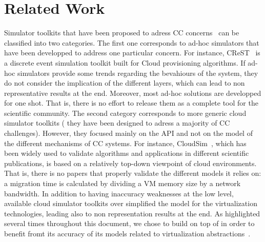 \section{Related Work}
\label{sec:related}
Simulator toolkits that  have been proposed
to adress CC concerns~\cite{CC13,DGSIM,cloudsim,icancloud,greencloud}
can be classified into two categories.
 The first one corresponds to ad-hoc simulators that have been developped to
address one particular concern. For instance, CReST~\cite{CC13} is a
discrete event simulation toolkit built for Cloud provisioning
algorithms. If ad-hoc simulators provide some trends
regarding the bevahiours of the system, they do not consider the
implication of the different layers, which can lead to non
representative results at the end. Moreover, most ad-hoc solutions are
developped for one shot. That is, there is no effort to release them
as a complete tool for the scientific community. The second category
\cite{icancloud,greencloud,cloudsim}
corresponds to more generic cloud simulator toolkits (\ie
they have been designed to adress a majority of CC
challenges). However,  they focused mainly on the API and not on
the model of the different mechanisms of CC systems. For instance, CloudSim~\cite{cloudsim}, which has been widely used to
validate algorithms and applications in different scientific
publications, is based on a relatively top-down viewpoint of cloud
environments.  That is, there is no papers that properly validate the
different models it relies on: a migration time is calculated by
dividing a VM memory size by a network bandwidth.
 In addition to having inaccuracy weaknesses at the low level, available cloud
simulator toolkits over simplified the model for the virtualization
technologies, leading also to non representation results at the
end. As highlighted several times throughout this document, we chose to
build \vmps on top of \sg in order to benefit fromt its accuracy of
its models related to virtualization abstractions~\cite{Hirofuchi:2013:ALM:2568486.2568524}.
